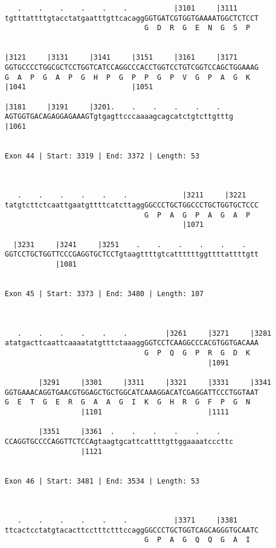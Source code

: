 \documentclass{article}
\begin{document}
\begin{Verbatim}
   .    .    .    .    .    .           |3101     |3111     
tgtttattttgtacctatgaatttgttcacaggGGTGATCGTGGTGAAAATGGCTCTCCT
                                 G  D  R  G  E  N  G  S  P  
                                                            
  
|3121     |3131     |3141     |3151     |3161     |3171     
GGTGCCCCTGGCGCTCCTGGTCATCCAGGCCCACCTGGTCCTGTCGGTCCAGCTGGAAAG
G  A  P  G  A  P  G  H  P  G  P  P  G  P  V  G  P  A  G  K  
|1041                         |1051                         
  
|3181     |3191     |3201.    .    .    .    .    .   
AGTGGTGACAGAGGAGAAAGTgtgagttcccaaaagcagcatctgtcttgtttg
|1061                                                 
  
 
Exon 44 | Start: 3319 | End: 3372 | Length: 53



   .    .    .    .    .    .             |3211     |3221   
tatgtcttctcaattgaatgttttcatcttaggGGCCCTGCTGGCCCTGCTGGTGCTCCC
                                 G  P  A  G  P  A  G  A  P  
                                          |1071             
  
  |3231     |3241     |3251    .    .    .    .    .    .   
GGTCCTGCTGGTTCCCGAGGTGCTCCTgtaagttttgtcattttttggttttattttgtt
            |1081                                           
  
 
Exon 45 | Start: 3373 | End: 3480 | Length: 107



   .    .    .    .    .    .         |3261     |3271     |3281
atatgacttcaattcaaaatatgtttctaaaggGGTCCTCAAGGCCCACGTGGTGACAAA
                                 G  P  Q  G  P  R  G  D  K  
                                                |1091       
  
        |3291     |3301     |3311     |3321     |3331     |3341
GGTGAAACAGGTGAACGTGGAGCTGCTGGCATCAAAGGACATCGAGGATTCCCTGGTAAT
G  E  T  G  E  R  G  A  A  G  I  K  G  H  R  G  F  P  G  N  
                  |1101                         |1111       
  
        |3351     |3361  .    .    .    .    .    .   
CCAGGTGCCCCAGGTTCTCCAgtaagtgcattcattttgttggaaaatcccttc
                  |1121                               
  
 
Exon 46 | Start: 3481 | End: 3534 | Length: 53



   .    .    .    .    .    .           |3371     |3381     
ttcactcctatgtacacttcctttctttccaggGGCCCTGCTGGTCAGCAGGGTGCAATC
                                 G  P  A  G  Q  Q  G  A  I  
                                                            

\end{Verbatim}
\end{document}
